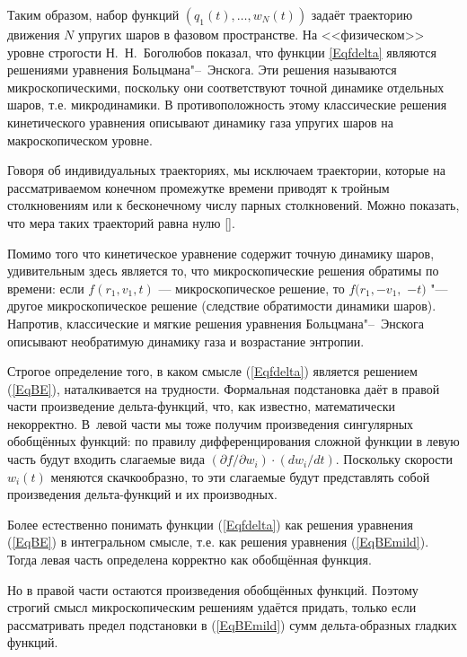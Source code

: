 Таким образом, набор функций $(q_1(t),\ldots,w_N(t))$ задаёт траекторию движения $N$ упругих шаров в фазовом пространстве. На <<физическом>> уровне строгости Н.~Н.~Боголюбов показал, что функции \eqref{Eqfdelta} являются решениями уравнения Больцмана"--~Энскога. Эти решения называются микроскопическими, поскольку они соответствуют точной динамике отдельных шаров, т.е. микродинамики. В противоположность этому классические решения кинетического уравнения описывают динамику газа упругих шаров на макроскопическом уровне.

Говоря об индивидуальных траекториях, мы исключаем траектории, которые на рассматриваемом конечном промежутке времени приводят к тройным столкновениям или к бесконечному числу парных столкновений. Можно показать, что мера таких траекторий равна нулю [].

Помимо того что кинетическое уравнение содержит точную динамику шаров, удивительным здесь является то, что микроскопические решения обратимы по времени: если $f(r_1,v_1,t)$ --- микроскопическое решение, то $f(r_1,-v_1,$ $-t)$ "--- другое микроскопическое решение (следствие обратимости динамики шаров). Напротив, классические и мягкие решения уравнения Больцмана"--~Энскога описывают необратимую динамику газа и возрастание энтропии.

Строгое определение того, в каком смысле (\ref{Eqfdelta}) является решением (\ref{EqBE}), наталкивается на трудности. Формальная подстановка даёт в правой части произведение дельта-функций, что, как известно, математически некорректно. В~левой части мы тоже получим произведения сингулярных обобщённых функций: по правилу дифференцирования сложной функции в левую часть будут входить слагаемые вида $({\partial f}/{\partial w_i})\cdot ({dw_i}/{dt})$. Поскольку скорости $w_i(t)$ меняются скачкообразно, то эти слагаемые будут представлять собой произведения дельта-функций и их производных.

Более естественно понимать функции (\ref{Eqfdelta}) как решения уравнения (\ref{EqBE}) в интегральном смысле, т.е. как решения уравнения (\ref{EqBEmild}). Тогда левая часть определена корректно как обобщённая функция.

Но в правой части остаются произведения обобщённых функций. Поэтому строгий смысл микроскопическим решениям удаётся придать, только если рассматривать предел подстановки в (\ref{EqBEmild}) сумм дельта-образных гладких функций.



